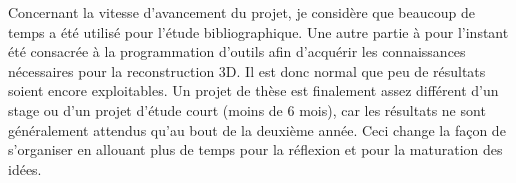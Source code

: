 
Concernant la vitesse d'avancement du projet, je considère que beaucoup de temps a été utilisé pour l'étude bibliographique.
Une autre partie à pour l'instant été consacrée à la programmation d'outils afin d'acquérir les connaissances nécessaires pour la reconstruction 3D.
Il est donc normal que peu de résultats soient encore exploitables.
Un projet de thèse est finalement assez différent d'un stage ou d'un projet d'étude court (moins de 6 mois), car les résultats ne sont généralement attendus qu'au bout de la deuxième année.
Ceci change la façon de s'organiser en allouant plus de temps pour la réflexion et pour la maturation des idées.
